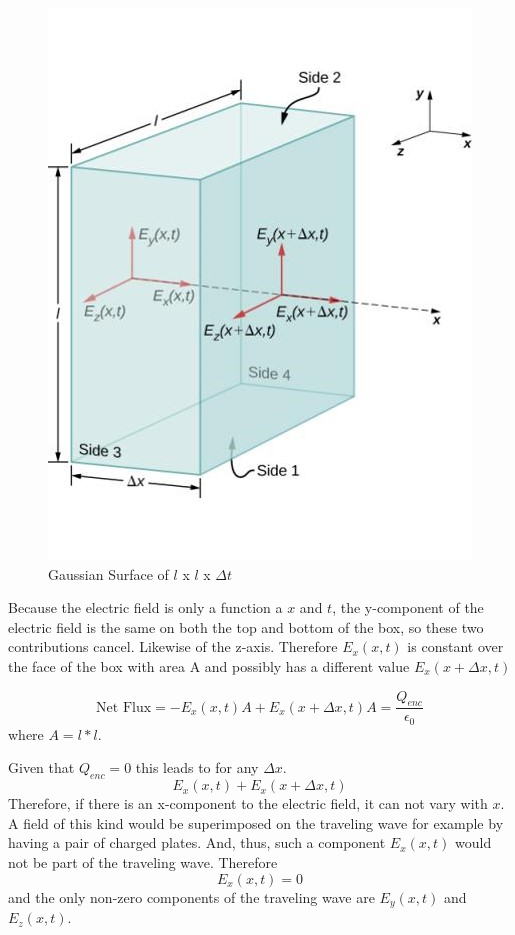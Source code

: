 \documentclass[14pt]{memoir}
\begin{document}
\begin{figure}[H]
\begin{center}
\includegraphics[scale=0.7]{fig/fig_16_06.jpg}
\caption{Gaussian Surface of $l$ x $l$ x $\Delta t$}
\label{fig:16_06}
\end{center}
\end{figure}

Because the electric field is only a function a $x$ and $t$, the y-component of the electric field is the same on both the top and bottom of the box, so these two contributions cancel. Likewise of the z-axis. Therefore $E_x(x,t)$ is constant over the face of the box with area A and possibly has a different value $E_x(x+\Delta x, t)$ 

\begin{equation}
\text{Net Flux} = -E_x(x,t)A + E_x(x+\Delta x, t)A = \frac{Q_{enc}}{\epsilon_0}
\end{equation}
where $A = l * l$. 

Given that $Q_{enc} = 0$ this leads to for any $\Delta x$.
\begin{equation}
E_x(x,t) + E_x(x+\Delta x, t) 
\end{equation}
Therefore, if there is an x-component to the electric field, it can not vary with $x$. A field of this kind would be superimposed on the traveling wave for example by having a pair of charged plates. And, thus, such a component $E_x(x,t)$ would not be part of the traveling wave. Therefore
\begin{equation}
E_x(x,t) = 0
\end{equation}
and the only non-zero components of the traveling wave are $E_y(x,t)$ and $E_z(x,t)$.
\end{document}
